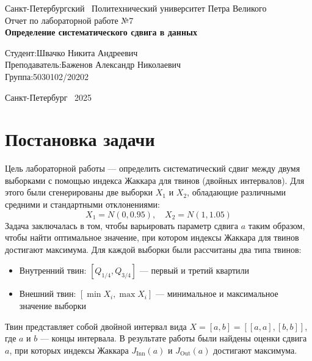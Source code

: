 \documentclass[a4paper]{article}
\begin{document}
    \begin{titlepage}
        \Large
        \begin{center}
            Санкт-Петербургский \ Политехнический университет Петра Великого\\
            \vspace{10em}Отчет по лабораторной работе №7\\
            \vspace{2em}
            \textbf{Определение систематического сдвига в данных}
        \end{center}
        \vspace{6em}
        \hfill\parbox{10cm}{
            \hspace*{2cm}\hspace*{-4cm}Студент:\hfill Швачко Никита Андреевич\\
            \hspace*{2cm}\hspace*{-4cm}Преподаватель:\hfill Баженов Александр Николаевич\\
            \hspace*{2cm}\hspace*{-4cm}Группа:\hfill 5030102/20202
        }
        \vspace{\fill}
        \begin{center}
            Санкт-Петербург \ 2025
        \end{center}
    \end{titlepage}
    \section{Постановка задачи}
    Цель лабораторной работы — определить систематический сдвиг между двумя выборками с помощью индекса Жаккара для твинов (двойных интервалов). 
    Для этого были сгенерированы две выборки \( X_1 \) и \( X_2 \), обладающие различными средними и стандартными отклонениями:
    \[
        X_1 = N(0, 0.95), \quad X_2 = N(1, 1.05)
    \]
    Задача заключалась в том, чтобы варьировать параметр сдвига \( a \) таким образом, чтобы найти оптимальное значение, 
    при котором индексы Жаккара для твинов достигают максимума. Для каждой выборки были рассчитаны два типа твинов:
    \begin{itemize}
        \item Внутренний твин: \(\left[Q_{1/4}, Q_{3/4}\right]\) — первый и третий квартили
        \item Внешний твин: \(\left[\min X_i, \max X_i\right]\) — минимальное и максимальное значение выборки
    \end{itemize}
    Твин представляет собой двойной интервал вида \(X = [a,b] = [[a,a],[b,b]]\), где \(a\) и \(b\) — концы интервала.
    В результате работы были найдены оценки сдвига \( a \), при которых индексы Жаккара \( J_{\text{Inn}}(a) \) и \( J_{\text{Out}}(a) \) 
    достигают максимума.
\end{document}
